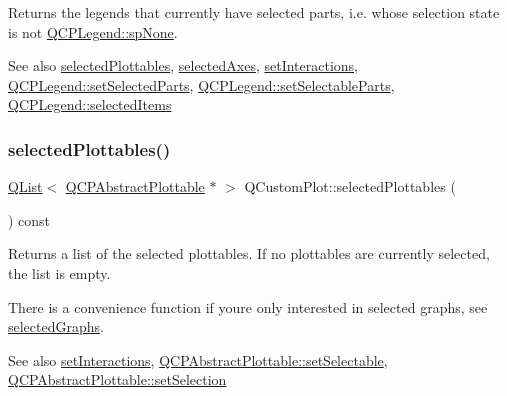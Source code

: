 Returns the legends that currently have selected parts, i.\+e. whose selection state is not \hyperlink{class_q_c_p_legend_a5404de8bc1e4a994ca4ae69e2c7072f1ab65003bec12b3c809a6377b6f75849db}{Q\+C\+P\+Legend\+::sp\+None}.

\begin{DoxySeeAlso}{See also}
\hyperlink{class_q_custom_plot_a747faaab57c56891e901a1e97fa4359a}{selected\+Plottables}, \hyperlink{class_q_custom_plot_a7e6b07792b1cb2c31681596582d14dbe}{selected\+Axes}, \hyperlink{class_q_custom_plot_a5ee1e2f6ae27419deca53e75907c27e5}{set\+Interactions}, \hyperlink{class_q_c_p_legend_a2aee309bb5c2a794b1987f3fc97f8ad8}{Q\+C\+P\+Legend\+::set\+Selected\+Parts}, \hyperlink{class_q_c_p_legend_a9ce60aa8bbd89f62ae4fa83ac6c60110}{Q\+C\+P\+Legend\+::set\+Selectable\+Parts}, \hyperlink{class_q_c_p_legend_ac7d9e567d5c551e09cd9bcc4306c5532}{Q\+C\+P\+Legend\+::selected\+Items} 
\end{DoxySeeAlso}
\mbox{\label{class_q_custom_plot_a747faaab57c56891e901a1e97fa4359a}} 
\subsubsection{\texorpdfstring{selected\+Plottables()}{selectedPlottables()}}
{\footnotesize\ttfamily \hyperlink{class_q_list}{Q\+List}$<$ \hyperlink{class_q_c_p_abstract_plottable}{Q\+C\+P\+Abstract\+Plottable} $\ast$ $>$ Q\+Custom\+Plot\+::selected\+Plottables (\begin{DoxyParamCaption}{ }\end{DoxyParamCaption}) const}

Returns a list of the selected plottables. If no plottables are currently selected, the list is empty.

There is a convenience function if you\textquotesingle{}re only interested in selected graphs, see \hyperlink{class_q_custom_plot_ad3547aded026d8a9ae6ef13a69080d06}{selected\+Graphs}.

\begin{DoxySeeAlso}{See also}
\hyperlink{class_q_custom_plot_a5ee1e2f6ae27419deca53e75907c27e5}{set\+Interactions}, \hyperlink{class_q_c_p_abstract_plottable_ac238d6e910f976f1f30d41c2bca44ac3}{Q\+C\+P\+Abstract\+Plottable\+::set\+Selectable}, \hyperlink{class_q_c_p_abstract_plottable_a219bc5403a9d85d3129165ec3f5ae436}{Q\+C\+P\+Abstract\+Plottable\+::set\+Selection} 
\end{DoxySeeAlso}
\mbox{\label{class_q_custom_plot_a500c64a109bc773c973ad274f2fa4190}} 
